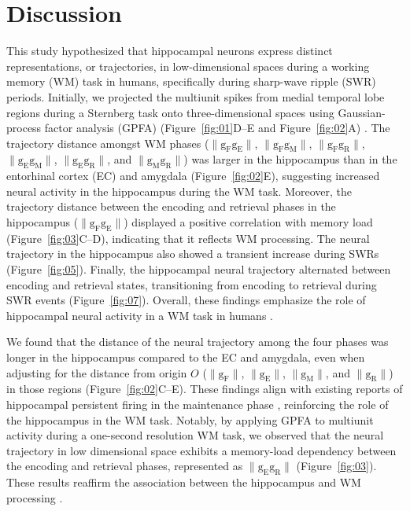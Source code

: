 
    \section{Discussion}
This study hypothesized that hippocampal neurons express distinct representations, or trajectories, in low-dimensional spaces during a working memory (WM) task in humans, specifically during sharp-wave ripple (SWR) periods. Initially, we projected the multiunit spikes from medial temporal lobe regions during a Sternberg task onto three-dimensional spaces using Gaussian-process factor analysis (GPFA) (Figure~\ref{fig:01}D--E and Figure~\ref{fig:02}A) \cite{yu_gaussian-process_2009}. The trajectory distance amongst WM phases ($\mathrm{\lVert g_{F}g_{E} \rVert}$, $\mathrm{\lVert g_{F}g_{M} \rVert}$, $\mathrm{\lVert g_{F}g_{R} \rVert}$, $\mathrm{\lVert g_{E}g_{M} \rVert}$, $\mathrm{\lVert g_{E}g_{R} \rVert}$, and $\mathrm{\lVert g_{M}g_{R} \rVert}$) was larger in the hippocampus than in the entorhinal cortex (EC) and amygdala (Figure~\ref{fig:02}E), suggesting increased neural activity in the hippocampus during the WM task. Moreover, the trajectory distance between the encoding and retrieval phases in the hippocampus ($\mathrm{\lVert g_{F}g_{E} \rVert}$) displayed a positive correlation with memory load (Figure~\ref{fig:03}C--D), indicating that it reflects WM processing. The neural trajectory in the hippocampus also showed a transient increase during SWRs (Figure~\ref{fig:05}). Finally, the hippocampal neural trajectory alternated between encoding and retrieval states, transitioning from encoding to retrieval during SWR events (Figure~\ref{fig:07}). Overall, these findings emphasize the role of hippocampal neural activity in a WM task in humans \cite{naber_reciprocal_2001,van_strien_anatomy_2009,strange_functional_2014}.

We found that the distance of the neural trajectory among the four phases was longer in the hippocampus compared to the EC and amygdala, even when adjusting for the distance from origin $O$ ($\mathrm{\lVert g_{F} \rVert}$, $\mathrm{\lVert g_{E} \rVert}$, $\mathrm{\lVert g_{M} \rVert}$, and $\mathrm{\lVert g_{R} \rVert}$) in those regions (Figure~\ref{fig:02}C--E). These findings align with existing reports of hippocampal persistent firing in the maintenance phase \cite{boran_persistent_2019} \cite{kaminski_persistently_2017} \cite{kornblith_persistent_2017} \cite{faraut_dataset_2018}, reinforcing the role of the hippocampus in the WM task. Notably, by applying GPFA to multiunit activity during a one-second resolution WM task, we observed that the neural trajectory in low dimensional space exhibits a memory-load dependency between the encoding and retrieval phases, represented as $\mathrm{\lVert g_{E}g_{R} \rVert}$ (Figure~\ref{fig:03}). These results reaffirm the association between the hippocampus and WM processing \cite{oso_boran_2020}.

